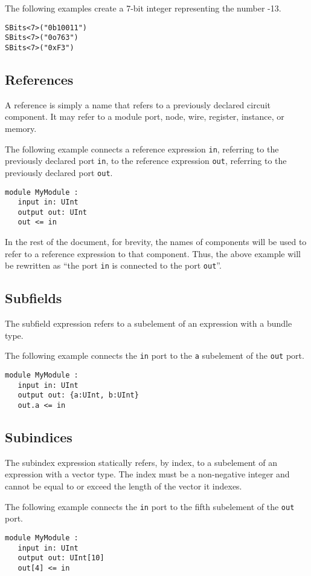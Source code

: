 \documentclass[12pt]{article}
\begin{document}
The following examples create a 7-bit integer representing the number -13.
\begin{verbatim}
SBits<7>("0b10011")
SBits<7>("0o763")
SBits<7>("0xF3")
\end{verbatim}

\subsection{References}
A reference is simply a name that refers to a previously declared circuit component. It may refer to a module port, node, wire, register, instance, or memory.

The following example connects a reference expression \verb|in|, referring to the previously declared port \verb|in|, to the reference expression \verb|out|, referring to the previously declared port \verb|out|.

\begin{verbatim}
module MyModule :
   input in: UInt
   output out: UInt
   out <= in
\end{verbatim}

In the rest of the document, for brevity, the names of components will be used to refer to a reference expression to that component. Thus, the above example will be rewritten as ``the port \verb|in| is connected to the port \verb|out|''.

\subsection{Subfields}\label{subfields}
The subfield expression refers to a subelement of an expression with a bundle type.

The following example connects the \verb|in| port to the \verb|a| subelement of the \verb|out| port. 
\begin{verbatim}
module MyModule :
   input in: UInt
   output out: {a:UInt, b:UInt}
   out.a <= in
\end{verbatim}

\subsection{Subindices}\label{subindices}
The subindex expression statically refers, by index, to a subelement of an expression with a vector type. The index must be a non-negative integer and cannot be equal to or exceed the length of the vector it indexes.

The following example connects the \verb|in| port to the fifth subelement of the \verb|out| port. 
\begin{verbatim}
module MyModule :
   input in: UInt
   output out: UInt[10]
   out[4] <= in
\end{verbatim}
\end{document}
